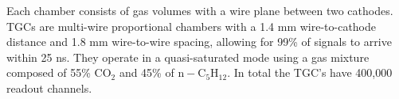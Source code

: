 Each chamber consists of gas volumes with a wire plane between two cathodes. TGCs are multi-wire proportional chambers with a 1.4 mm wire-to-cathode distance and 1.8 mm wire-to-wire spacing, allowing for 99\% of signals to arrive within 25 ns. They operate in a quasi-saturated mode using a gas mixture composed of 55\% $\mathrm{CO}_2$ and 45\% of $\mathrm{n-C_{5}H_{12}}$. In total the TGC's have 400,000 readout channels.
